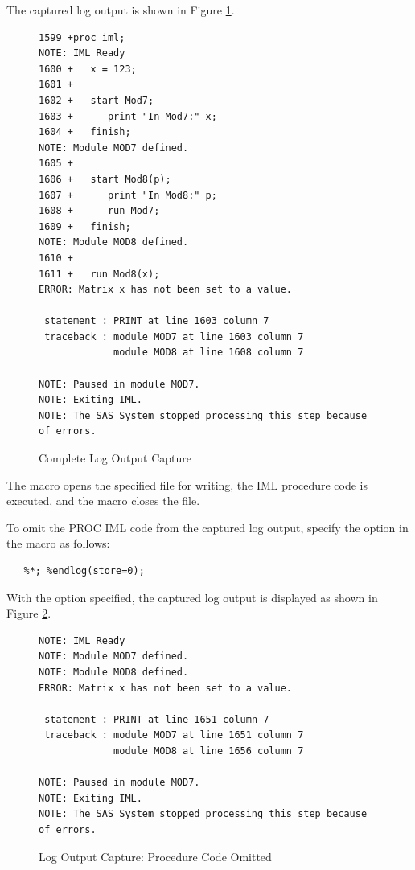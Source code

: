 \documentclass[article,oneside]{memoir}
\begin{document}
  The captured log output is shown in Figure \ref{logcomplete}.


\begin{figure}[H]
\begin{snugshade}
\begin{verbatim}
1599 +proc iml;
NOTE: IML Ready
1600 +   x = 123;
1601 +
1602 +   start Mod7;
1603 +      print "In Mod7:" x;
1604 +   finish;
NOTE: Module MOD7 defined.
1605 +
1606 +   start Mod8(p);
1607 +      print "In Mod8:" p;
1608 +      run Mod7;
1609 +   finish;
NOTE: Module MOD8 defined.
1610 +
1611 +   run Mod8(x);
ERROR: Matrix x has not been set to a value.

 statement : PRINT at line 1603 column 7
 traceback : module MOD7 at line 1603 column 7
             module MOD8 at line 1608 column 7

NOTE: Paused in module MOD7.
NOTE: Exiting IML.
NOTE: The SAS System stopped processing this step because of errors.
\end{verbatim}
\end{snugshade}
\caption{Complete Log Output Capture}\label{logcomplete}
\end{figure}

  The  macro opens the specified file for writing, the IML
  procedure code is executed, and the  macro closes the file.

  To omit the PROC IML code from the captured log output,
  specify the  option in the  macro as follows:

\begin{snugshade}
\begin{verbatim}
   %*; %endlog(store=0);
\end{verbatim}
\end{snugshade}

   With the  option specified, the captured log output is
   displayed as shown in Figure \ref{lognoproc}.

\begin{figure}[H]
\begin{snugshade}
\begin{verbatim}
NOTE: IML Ready
NOTE: Module MOD7 defined.
NOTE: Module MOD8 defined.
ERROR: Matrix x has not been set to a value.

 statement : PRINT at line 1651 column 7
 traceback : module MOD7 at line 1651 column 7
             module MOD8 at line 1656 column 7

NOTE: Paused in module MOD7.
NOTE: Exiting IML.
NOTE: The SAS System stopped processing this step because of errors.
\end{verbatim}
\end{snugshade}
\caption{Log Output Capture: Procedure Code Omitted}\label{lognoproc}
\end{figure}
\end{document}
